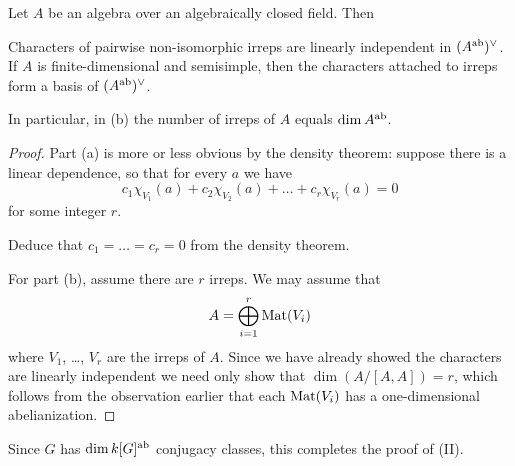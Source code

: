 \begin{theorem}
	Let $A$ be an algebra over an algebraically closed field. Then
	\begin{enumerate}[(a)]
		\ii Characters of pairwise non-isomorphic irreps are
		linearly independent in $(A^\text{ab})^\vee$.
		\ii If $A$ is finite-dimensional and semisimple,
		then the characters attached to irreps
		form a basis of $(A^\text{ab})^\vee$.
	\end{enumerate}
	In particular, in (b) the number of irreps of $A$ equals $\dim A^\text{ab}$.
\end{theorem}
\begin{proof}
	Part (a) is more or less obvious by the density theorem:
	suppose there is a linear dependence, so that for every $a$ we have
	\[ c_1 \chi_{V_1}(a) + c_2 \chi_{V_2}(a) + \dots + c_r \chi_{V_r} (a) = 0\]
	for some integer $r$.
	\begin{ques}
		Deduce that $c_1 = \dots = c_r = 0$ from the density theorem.
	\end{ques}
	For part (b), assume there are $r$ irreps.
	We may assume that \[ A = \bigoplus_{i=1}^r \mathrm{Mat}(V_i) \]
	where $V_1$, \dots, $V_r$ are the irreps of $A$.
	Since we have already showed the characters are linearly independent
	we need only show that $\dim ( A / [A,A] ) = r$,
	which follows from the observation earlier that each $\mathrm{Mat}(V_i)$
	has a one-dimensional abelianization.
\end{proof}
Since $G$ has $\dim k[G]^\text{ab}$ conjugacy classes,
this completes the proof of (II).

